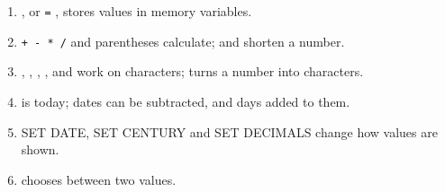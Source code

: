 \begin{enumerate}
\item {}   , or  \texttt{=}
  , stores values in memory variables.
\item \texttt{+ - * /} and parentheses calculate;  and 
  shorten a number.
\item {}, , , ,  and
   work on characters;  turns a number into characters.
\item {} is today; dates can be subtracted, and days added to them.
\item SET DATE, SET CENTURY and SET DECIMALS change how values are shown.
\item {} chooses between two values.
\end{enumerate}
